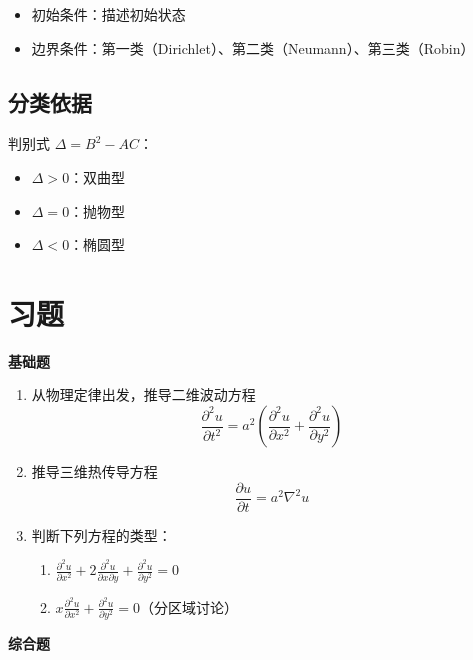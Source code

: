 \begin{itemize}
    \item 初始条件：描述初始状态
    \item 边界条件：第一类（Dirichlet）、第二类（Neumann）、第三类（Robin）
\end{itemize}

\subsection{分类依据}

判别式 $\Delta = B^2 - AC$：
\begin{itemize}
    \item $\Delta > 0$：双曲型
    \item $\Delta = 0$：抛物型
    \item $\Delta < 0$：椭圆型
\end{itemize}

\section{习题}

\textbf{基础题}

\begin{enumerate}
    \item 从物理定律出发，推导二维波动方程
    \begin{equation}
        \frac{\partial^2 u}{\partial t^2} = a^2\left(\frac{\partial^2 u}{\partial x^2} + \frac{\partial^2 u}{\partial y^2}\right)
    \end{equation}
    
    \item 推导三维热传导方程
    \begin{equation}
        \frac{\partial u}{\partial t} = a^2\nabla^2 u
    \end{equation}
    
    \item 判断下列方程的类型：
    \begin{enumerate}
        \item $\frac{\partial^2 u}{\partial x^2} + 2\frac{\partial^2 u}{\partial x\partial y} + \frac{\partial^2 u}{\partial y^2} = 0$
        \item $x\frac{\partial^2 u}{\partial x^2} + \frac{\partial^2 u}{\partial y^2} = 0$（分区域讨论）
    \end{enumerate}
\end{enumerate}

\textbf{综合题}

